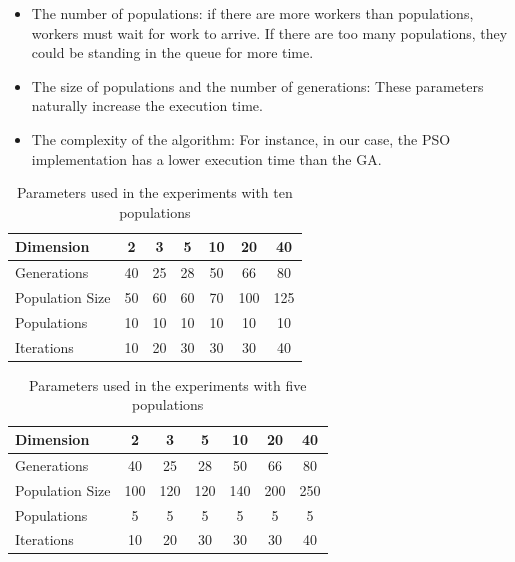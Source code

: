 \documentclass[review]{elsarticle}
\begin{document}
\begin{itemize}
    \item The number of populations: if there are more workers than populations, workers
    must wait for work to arrive. If there are too many populations, they could be
    standing in the queue for more time.
    \item The size of populations and the number of generations:
    These parameters naturally increase the execution time.
    \item The complexity of the algorithm: For instance, in our case,
    the PSO implementation has a lower execution time than the GA.
\end{itemize}


\begin{table}[h!tbp]
  \small
  \caption{Parameters used in the experiments with ten populations
  }
  \label{tab:params:10}
  \vspace{0.25cm}
  \centering
  \small
  \begin{tabular}{|l|c|c|c|c|c|c|}
    \hline
    Dimension        & 2  & 3  & 5  & 10 & 20  & 40  \\ \hline
    Generations      & 40 & 25 & 28 & 50 & 66  & 80  \\ \hline
    Population Size  & 50 & 60 & 60 & 70 & 100 & 125 \\ \hline
    Populations      & 10 & 10 & 10 & 10 & 10  & 10  \\ \hline
    Iterations       & 10 & 20 & 30 & 30 & 30  & 40  \\ \hline  
  \end{tabular}
\end{table}
%
\begin{table}[h!tbp]
  \small
  \caption{Parameters used in the experiments with five populations
  }
  \label{tab:params:5}
  \vspace{0.25cm}
  \centering
  \small
  \begin{tabular}{|l|c|c|c|c|c|c|}
    \hline
    Dimension        & 2  & 3  & 5  & 10 & 20  & 40  \\ \hline
    Generations      & 40 & 25 & 28 & 50 & 66  & 80  \\ \hline
    Population Size  & 100 & 120 & 120 & 140 & 200 & 250 \\ \hline
    Populations      & 5 & 5 & 5 & 5 & 5  & 5  \\ \hline
    Iterations       & 10 & 20 & 30 & 30 & 30  & 40  \\ \hline  
  \end{tabular}
\end{table}
\end{document}

